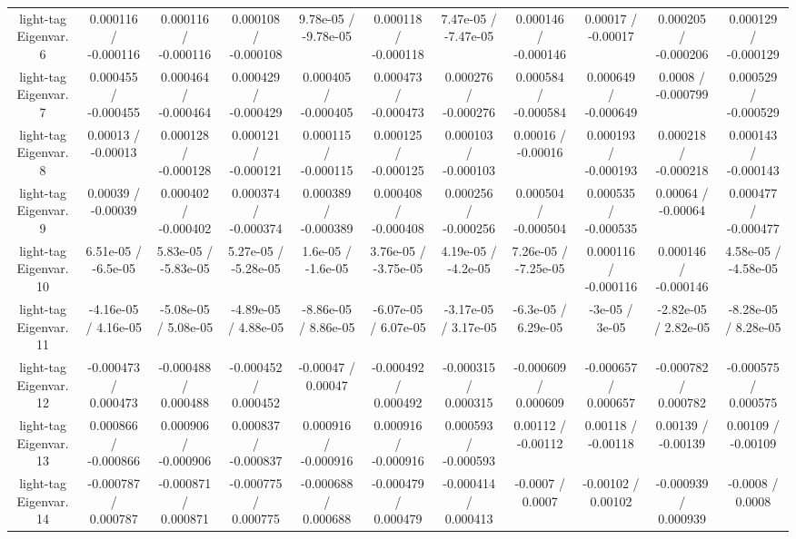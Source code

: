 \begin{table}[htbp]
\begin{center}
\begin{tabular}{|c|c|c|c|c|c|c|c|c|c|c|}
  light-tag Eigenvar. 6 & 0.000116 / -0.000116 & 0.000116 / -0.000116 & 0.000108 / -0.000108 & 9.78e-05 / -9.78e-05 & 0.000118 / -0.000118 & 7.47e-05 / -7.47e-05 & 0.000146 / -0.000146 & 0.00017 / -0.00017 & 0.000205 / -0.000206 & 0.000129 / -0.000129 \\ 
  light-tag Eigenvar. 7 & 0.000455 / -0.000455 & 0.000464 / -0.000464 & 0.000429 / -0.000429 & 0.000405 / -0.000405 & 0.000473 / -0.000473 & 0.000276 / -0.000276 & 0.000584 / -0.000584 & 0.000649 / -0.000649 & 0.0008 / -0.000799 & 0.000529 / -0.000529 \\ 
  light-tag Eigenvar. 8 & 0.00013 / -0.00013 & 0.000128 / -0.000128 & 0.000121 / -0.000121 & 0.000115 / -0.000115 & 0.000125 / -0.000125 & 0.000103 / -0.000103 & 0.00016 / -0.00016 & 0.000193 / -0.000193 & 0.000218 / -0.000218 & 0.000143 / -0.000143 \\ 
  light-tag Eigenvar. 9 & 0.00039 / -0.00039 & 0.000402 / -0.000402 & 0.000374 / -0.000374 & 0.000389 / -0.000389 & 0.000408 / -0.000408 & 0.000256 / -0.000256 & 0.000504 / -0.000504 & 0.000535 / -0.000535 & 0.00064 / -0.00064 & 0.000477 / -0.000477 \\ 
  light-tag Eigenvar. 10 & 6.51e-05 / -6.5e-05 & 5.83e-05 / -5.83e-05 & 5.27e-05 / -5.28e-05 & 1.6e-05 / -1.6e-05 & 3.76e-05 / -3.75e-05 & 4.19e-05 / -4.2e-05 & 7.26e-05 / -7.25e-05 & 0.000116 / -0.000116 & 0.000146 / -0.000146 & 4.58e-05 / -4.58e-05 \\ 
  light-tag Eigenvar. 11 & -4.16e-05 / 4.16e-05 & -5.08e-05 / 5.08e-05 & -4.89e-05 / 4.88e-05 & -8.86e-05 / 8.86e-05 & -6.07e-05 / 6.07e-05 & -3.17e-05 / 3.17e-05 & -6.3e-05 / 6.29e-05 & -3e-05 / 3e-05 & -2.82e-05 / 2.82e-05 & -8.28e-05 / 8.28e-05 \\ 
  light-tag Eigenvar. 12 & -0.000473 / 0.000473 & -0.000488 / 0.000488 & -0.000452 / 0.000452 & -0.00047 / 0.00047 & -0.000492 / 0.000492 & -0.000315 / 0.000315 & -0.000609 / 0.000609 & -0.000657 / 0.000657 & -0.000782 / 0.000782 & -0.000575 / 0.000575 \\ 
  light-tag Eigenvar. 13 & 0.000866 / -0.000866 & 0.000906 / -0.000906 & 0.000837 / -0.000837 & 0.000916 / -0.000916 & 0.000916 / -0.000916 & 0.000593 / -0.000593 & 0.00112 / -0.00112 & 0.00118 / -0.00118 & 0.00139 / -0.00139 & 0.00109 / -0.00109 \\ 
  light-tag Eigenvar. 14 & -0.000787 / 0.000787 & -0.000871 / 0.000871 & -0.000775 / 0.000775 & -0.000688 / 0.000688 & -0.000479 / 0.000479 & -0.000414 / 0.000413 & -0.0007 / 0.0007 & -0.00102 / 0.00102 & -0.000939 / 0.000939 & -0.0008 / 0.0008 \\ 

\end{tabular}
\end{center}
\end{table}
